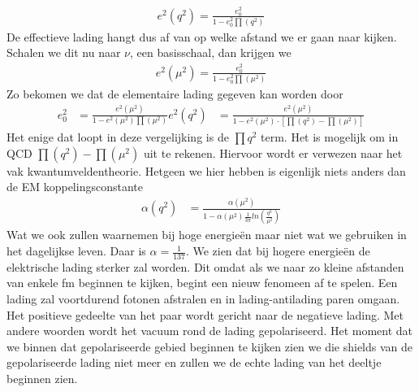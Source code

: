 \documentclass[../main.tex]{subfiles}
\begin{document}
\begin{equation}
    \begin{aligned}
        \label{eq:running_lading}
        e^2(q^2) = \frac{e_0^2}{1-e_0^2\prod(q^2)} 
    \end{aligned}
\end{equation}
De effectieve lading hangt dus af van op welke afstand we er gaan naar kijken. Schalen we dit nu naar $\nu$, een basisschaal, dan krijgen we
\begin{equation}
    \begin{aligned}
        \label{eq:running_lading_1}
        e^2(\mu^2) = \frac{e_0^2}{1-e_0^2\prod(\mu^2)} 
    \end{aligned}
\end{equation}
Zo bekomen we dat de elementaire lading gegeven kan worden door
\begin{equation}
    \begin{aligned}
        \label{eq:running_lading_2}
        e_0^2 &= \frac{e^2(\mu^2)}{1-e^2(\mu^2)\prod(\mu^2)} 
        e^2(q^2) &= \frac{e^2(\mu^2)}{1-e^2(\mu^2)\cdot [\prod(q^2)-\prod(\mu^2)]}
    \end{aligned}
\end{equation}
Het enige dat loopt in deze vergelijking is de $\prod{q^2}$ term. Het is mogelijk om in QCD $\prod(q^2)-\prod(\mu^2)$ uit te rekenen. Hiervoor wordt er verwezen naar het vak kwantumveldentheorie. Hetgeen we hier hebben is eigenlijk niets anders dan de EM koppelingsconstante
\begin{equation}
    \begin{aligned}
        \label{eq:em_koppelingsconstante}
        \alpha(q^2) &= \frac{\alpha(\mu^2)}{1-\alpha(\mu^2) \frac{1}{3\pi} ln\left( \frac{q^2}{\mu^2} \right)}
    \end{aligned}
\end{equation}
Wat we ook zullen waarnemen bij hoge energieën maar niet wat we gebruiken in het dagelijkse leven. Daar is $\alpha = \frac{1}{137}$. We zien dat bij hogere energieën de elektrische lading sterker zal worden. Dit omdat als we naar zo kleine afstanden van enkele fm beginnen te kijken, begint een nieuw fenomeen af te spelen. Een lading zal voortdurend fotonen afstralen en in lading-antilading paren omgaan. Het positieve gedeelte van het paar wordt gericht naar de negatieve lading. Met andere woorden wordt het vacuum rond de lading gepolariseerd. Het moment dat we binnen dat gepolariseerde gebied beginnen te kijken zien we die shields van de gepolariseerde lading niet meer en zullen we de echte lading van het deeltje beginnen zien.
\end{document}

